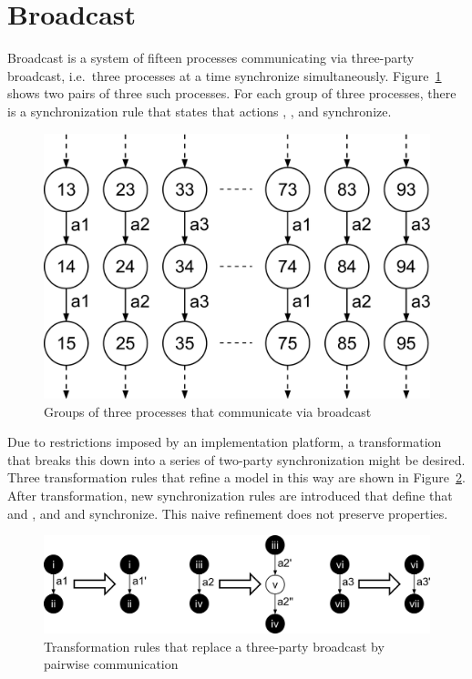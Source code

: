 \section{Broadcast}
\label{sec:prop-pres-case-studies:broadcast}
Broadcast is a system of fifteen processes communicating via three-party broadcast, i.e.\ three processes at a time synchronize simultaneously.
Figure~\ref{fig:prop-pres-case-studies:broadcast-network} shows two pairs of three such processes.
For each group of three processes, there is a synchronization rule that states that actions , , and  synchronize.

\begin{figure}[hbt]
\centering
\includegraphics[scale=0.18]{prop-pres-case-studies/figs/broadcast-network}
\caption{Groups of three processes that communicate via broadcast}
\label{fig:prop-pres-case-studies:broadcast-network}
\end{figure}

Due to restrictions imposed by an implementation platform, a transformation that breaks this down into a series of two-party synchronization might be desired.
Three transformation rules that refine a model in this way are shown in Figure~\ref{fig:prop-pres-case-studies:faulty-broadcast-rules}.
After transformation, new synchronization rules are introduced that define that  and , and   and  synchronize.
This naive refinement does not preserve properties.

\begin{figure}[hbt]
\centering
\includegraphics[scale=0.2]{prop-pres-case-studies/figs/faulty-broadcast-rules}
\caption{Transformation rules that replace a three-party broadcast by pairwise communication}
\label{fig:prop-pres-case-studies:faulty-broadcast-rules}
\end{figure}

